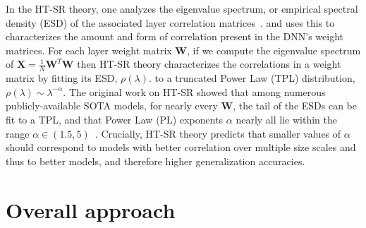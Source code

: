 \documentclass{article}
\begin{document}
In the HT-SR theory, one analyzes the eigenvalue spectrum, or empirical spectral density (ESD) 
of the associated layer correlation matrices~\citep{MM18_TR,MM19_HTSR_ICML,MM20_SDM}.
and uses this to characterizes the amount and form of correlation present in the DNN's weight matrices.
For each layer weight matrix $\mathbf{W}$, if we compute the eigenvalue spectrum of 
$ \mathbf{X} = \frac{1}{N}\mathbf{W}^{T}\mathbf{W} $
then HT-SR theory characterizes the correlations in a weight matrix by fitting its ESD, $\rho(\lambda)$.
to a truncated Power Law (TPL) distribution,  $\rho(\lambda)\sim\lambda^{-\alpha} $.
%
The original work on HT-SR showed that among numerous publicly-available SOTA models, for nearly every $\mathbf{W}$,  the tail of the ESDs can be fit to a  TPL, and that Power Law (PL) exponents $\alpha$ nearly all lie within the range $\alpha\in(1.5,5)$~\citep{MM18_TR,MM19_HTSR_ICML,MM20_SDM}.
%
%
Crucially, HT-SR theory predicts that smaller values of $\alpha$ should correspond to models with better correlation over multiple size scales and thus to better models,
and therefore higher generalization accuracies.


\section*{Overall approach}
\end{document}
